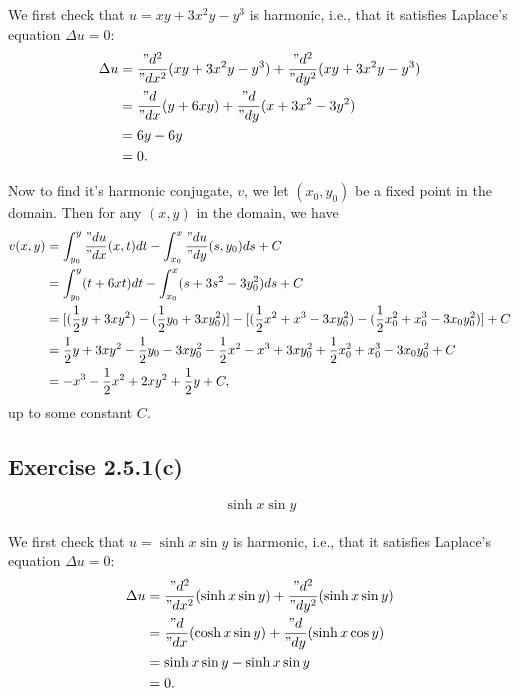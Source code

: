 \documentclass[12pt]{article}
\newenvironment{problem}
    {\begin{lrbox}{\mybox}\begin{minipage}{\textwidth-10pt}}
    {\end{minipage}\end{lrbox}\framebox[6.5in]{\usebox{\mybox}}}
\newcommand{\pd}[2]{\frac{"d#1}{"d#2}}
\newcommand{\pdn}[3]{\frac{"d^{#3}#1}{"d#2^{#3}}}
\begin{document}
We first check that $u=xy+3x^2y-y^3$ is harmonic, i.e., that it satisfies Laplace's equation $\Delta u=0$:
\begin{align*}
    \Delta u 
        &= \pdn{}{x}{2}(xy+3x^2y-y^3) + \pdn{}{y}{2}(xy+3x^2y-y^3) \\
        &= \pd{}{x}(y+6xy) + \pd{}{y}(x+3x^2-3y^2) \\
        &= 6y - 6y \\
        &= 0.
\end{align*}

Now to find it's harmonic conjugate, $v$, we let $(x_0,y_0)$ be a fixed point in the domain. Then for any $(x,y)$ in the domain, we have
\begin{align*}
    v(x,y)
        &= \int_{y_0}^y\pd ux (x,t) dt - \int_{x_0}^x\pd uy (s,y_0)ds + C \\
        &= \int_{y_0}^y(t + 6xt) dt - \int_{x_0}^x(s + 3s^2 - 3y_0^2)ds + C \\
        &= [(\frac12y + 3xy^2) - (\frac12y_0 + 3xy_0^2)] - [(\frac12x^2 + x^3 - 3xy_0^2) - (\frac12x_0^2 + x_0^3 - 3x_0y_0^2)] + C \\
        &= \frac12y + 3xy^2 - \frac12y_0 - 3xy_0^2 - \frac12x^2 - x^3 + 3xy_0^2 + \frac12x_0^2 + x_0^3 - 3x_0y_0^2 + C \\
        &= -x^3 -\frac12x^2 +2xy^2 + \frac12y + C,
\end{align*}
up to some constant $C$.

\subsection*{Exercise 2.5.1(c)}
\begin{problem}
    \[\sinh x \sin y\]
\end{problem}
\paragraph{}

We first check that $u=\sinh x \sin y$ is harmonic, i.e., that it satisfies Laplace's equation $\Delta u=0$:
\begin{align*}
    \Delta u 
        &= \pdn{}{x}{2}(\sinh x \sin y) + \pdn{}{y}{2}(\sinh x \sin y) \\
        &= \pd{}{x}(\cosh x \sin y) + \pd{}{y}(\sinh x \cos y) \\
        &= \sinh x \sin y - \sinh x \sin y \\
        &= 0.
\end{align*}
\end{document}
